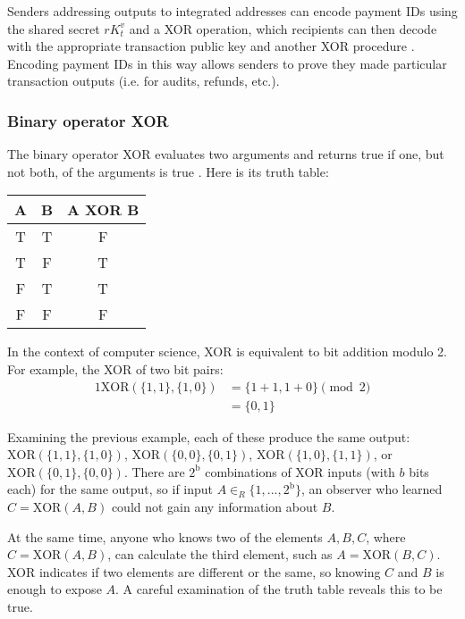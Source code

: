 Senders addressing outputs to integrated addresses can encode payment IDs using the shared secret $r K_t^v$ and a XOR operation, which recipients can then decode with the appropriate transaction public key and another XOR procedure \cite{integrated-addresses}. Encoding payment IDs in this way allows senders to prove they made particular transaction outputs (i.e. for audits, refunds, etc.).

\subsubsection*{Binary operator XOR}

The binary operator XOR evaluates two arguments and returns true if one, but not both, of the arguments is true \cite{wolfram-xor}. Here is its truth table:

\begin{center}
    \begin{tabular}{|c|c|c|}
    \hline
        A & B & A XOR B \\
    \hline\hline
        T & T & F \\
    \hline
        T & F & T \\
    \hline
        F & T & T \\
    \hline
        F & F & F \\
    \hline
    \end{tabular}
\end{center}

In the context of computer science, XOR is equivalent to bit addition modulo 2. For example, the XOR of two bit pairs:
\begin{alignat*}{1}
    \text{XOR}(\{1,1\},\{1,0\}) &= \{1+1,1+0\} \pmod 2 \\
                                &= \{0,1\}
\end{alignat*}

Examining the previous example, each of these produce the same output: $\text{XOR}(\{1,1\},\{1,0\})$, $\text{XOR}(\{0,0\},\{0,1\})$, $\text{XOR}(\{1,0\},\{1,1\})$, or $\text{XOR}(\{0,1\},\{0,0\})$. There are $2^{\text{b}}$ combinations of XOR inputs (with $b$ bits each) for the same output, so if input $A \in_R \{1,...,2^{\text{b}}\}$, an observer who learned $C = \text{XOR}(A,B)$ could not gain any information about $B$.

At the same time, anyone who knows two of the elements $A,B,C$, where $C = \text{XOR}(A,B)$, can calculate the third element, such as $A = \text{XOR}(B,C)$. XOR indicates if two elements are different or the same, so knowing $C$ and $B$ is enough to expose $A$. A careful examination of the truth table reveals this to be true.

